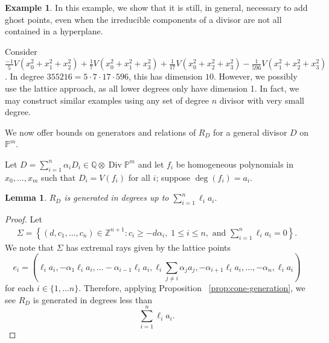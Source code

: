 \documentclass{amsart}
\theoremstyle{plain}
\newtheorem{lem}[thm]{Lemma}
\theoremstyle{definition}
\newtheorem{example}[thm]{Example}
\theoremstyle{remark}
\numberwithin{equation}{section}
\newcommand\bq{{\mathbb Q}}
\newcommand\bp{{\mathbb P}}
\newcommand\bz{{\mathbb Z}}
\DeclareMathOperator\di{Div}
\newcommand\bida{a}
\begin{document}
\begin{example}
\label{eg:radical}
In this example, we show that it is still, in general, necessary to add ghost points, even when the irreducible components of a divisor are not all contained in a hyperplane.

Consider $\frac{-1}{5}V(x_0^2 + x_1^2 + x_2^2) + \frac{1}{7}V(x_0^2 + x_1^2 + x_3^2) + \frac{1}{17}V(x_0^2 + x_2^2 + x_3^2) - \frac{1}{596}V(x_1^2 + x_2^2 + x_3^2)$. In degree $355216 = 5 \cdot 7 \cdot 17 \cdot 596$, this has dimension $10$. 
However, we possibly use the lattice approach, as all lower degrees only have dimension 1. In fact, we may construct similar examples using any set of degree $n$ divisor with very small degree.
\end{example}

We now offer bounds on generators and relations of $R_D$ for a general divisor $D$ on $\bp^m$.

Let $D = \sum_{i=1}^n \alpha_i D_i \in \bq \otimes \di \bp^m$ and let $f_i$ be homogeneous polynomials in $x_0, \ldots, x_m$ such that $D_i = V(f_i)$ for all $i$; suppose $\deg(f_i) = a_i$.

\begin{lem} \label{lem:proj-generators}
$R_D$ is generated in degrees up to $\sum_{i=1}^n \ell_i a_i.$
\end{lem}
\begin{proof}
Let 
\begin{align}\label{eqn:Sigma-def}
	\Sigma = \left \{(d, c_1, \ldots, c_n) \in \bz^{n+1} : c_i \geq - d \alpha_i, \; 1 \leq i \leq n, \text{ and } \sum_{i=1}^{n} \ell_i \bida_i = 0 \right \}.
\end{align}
We note that $\Sigma$ has extremal rays given by the lattice points 
\begin{equation}\label{defn:e-i-proj}
	e_i = \left(\ell_i \bida_i, - \alpha_1 \ell_i \bida_i, \ldots -\alpha_{i-1} \ell_i \bida_i, \ell_i \sum_{j\ne i} \alpha_j \bida_j, -\alpha_{i+1} \ell_i \bida_i, \ldots, -\alpha_n, \ell_i \bida_i \right)
\end{equation}
for each $i\in \{1, \ldots n\}$.
Therefore, applying Proposition ~\ref{prop:cone-generation}, we see $R_D$ is generated in degrees less than
\[
	\sum_{i=1}^n \ell_i a_i.
\]
\end{proof}
\end{document}
